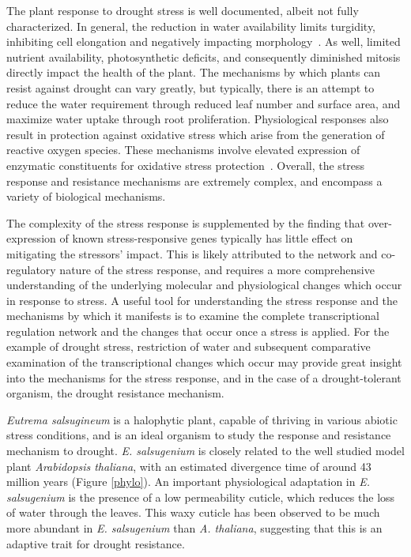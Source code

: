 \documentclass[12pt]{article}
\newcommand{\esal}{\textit{E. salsugenium}}
\begin{document}
	The plant response to drought stress is well documented, albeit not fully characterized. In general, the reduction in water availability limits turgidity, inhibiting cell elongation and negatively impacting morphology~\cite{farooq2009plant}. As well, limited nutrient availability, photosynthetic deficits, and consequently diminished mitosis directly impact the health of the plant. 
	The mechanisms by which plants can resist against drought can vary greatly, but typically, there is an attempt to reduce the water requirement through reduced leaf number and surface area, and maximize water uptake through root proliferation. Physiological responses also result in protection against oxidative stress which arise from the generation of reactive oxygen species. These mechanisms involve elevated expression of enzymatic constituents for oxidative stress protection~\cite{farooq2009plant}. Overall, the stress response and resistance mechanisms are extremely complex, and encompass a variety of biological mechanisms. 
	
	The complexity of the stress response is supplemented by the finding that over-expression of known stress-responsive genes typically has little effect on mitigating the stressors' impact. This is likely attributed to the network and co-regulatory nature of the stress response, and requires a more comprehensive understanding of the underlying molecular and physiological changes which occur in response to stress. A useful tool for understanding the stress response and the mechanisms by which it manifests is to examine the complete transcriptional regulation network and the changes that occur once a stress is applied. For the example of drought stress, restriction of water and subsequent comparative examination of the transcriptional changes which occur may provide great insight into the mechanisms for the stress response, and in the case of a drought-tolerant organism, the drought resistance mechanism. 
	
	\textit{Eutrema salsugineum} is a halophytic plant, capable of thriving in various abiotic stress conditions, and is an ideal organism to study the response and resistance mechanism to drought. \esal{} is closely related to the well studied model plant \textit{Arabidopsis thaliana}, with an estimated divergence time of around 43 million years (Figure \ref{phylo}). An important physiological adaptation in \esal{} is the presence of a low permeability cuticle, which reduces the loss of water through the leaves. This waxy cuticle has been observed to be much more abundant in \esal{} than \textit{A. thaliana}, suggesting that this is an adaptive trait for drought resistance. 
	
\end{document}
